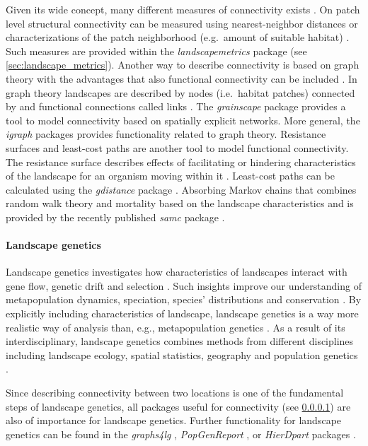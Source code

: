 \documentclass[smallextended]{svjour3}       %
\begin{document}
Given its wide concept, many different measures of connectivity exists
\cite{Kindlmann2008}. On patch level structural connectivity can be
measured using nearest-neighbor distances or characterizations of the
patch neighborhood (e.g.~amount of suitable habitat)
\cite{Kindlmann2008,With2019}. Such measures are provided within the
\emph{landscapemetrics} package (see \ref{sec:landscape_metrics}).
Another way to describe connectivity is based on graph theory with the
advantages that also functional connectivity can be included
\cite{Kindlmann2008}. In graph theory \cite{Laita2011} landscapes are
described by nodes (i.e.~habitat patches) connected by and functional
connections called links \cite{Laita2011}. The \emph{grainscape} package
\cite{Chubaty2020} provides a tool to model connectivity based on
spatially explicit networks. More general, the \emph{igraph} packages
\cite{Csardi2006} provides functionality related to graph theory.
Resistance surfaces and least-cost paths are another tool to model
functional connectivity. The resistance surface describes effects of
facilitating or hindering characteristics of the landscape for an
organism moving within it \cite{Adriaensen2003}. Least-cost paths can be
calculated using the \emph{gdistance} package \cite{vanEtten2017}.
Absorbing Markov chains that combines random walk theory and mortality
based on the landscape characteristics \cite{Fletcher2019a} and is
provided by the recently published \emph{samc} package \cite{Marx2020}.

\hypertarget{sec:landscape_genetics}{%
\paragraph{Landscape genetics}\label{sec:landscape_genetics}}

Landscape genetics investigates how characteristics of landscapes
interact with gene flow, genetic drift and selection \cite{Manel2003}.
Such insights improve our understanding of metapopulation dynamics,
speciation, species' distributions and conservation \cite{Storfer2007}.
By explicitly including characteristics of landscape, landscape genetics
is a way more realistic way of analysis than, e.g., metapopulation
genetics \cite{Holderegger2006}. As a result of its interdisciplinary,
landscape genetics combines methods from different disciplines including
landscape ecology, spatial statistics, geography and population genetics
\cite{Storfer2007}.

Since describing connectivity between two locations is one of the
fundamental steps of landscape genetics, all packages useful for
connectivity (see \ref{sec:landscape_genetics}) are also of importance
for landscape genetics. Further functionality for landscape genetics can
be found in the \emph{graphs4lg} \cite{Savary2020}, \emph{PopGenReport}
\cite{Adamack2014,Gruber2015}, or \emph{HierDpart} packages
\cite{Qin2019}.
\end{document}
